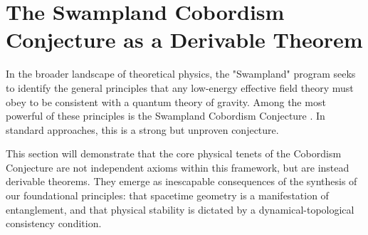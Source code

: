 \documentclass[11pt, letterpaper]{report}
\theoremstyle{plain} %
\theoremstyle{definition} %
\theoremstyle{remark} %
\begin{document}
\section{The Swampland Cobordism Conjecture as a Derivable Theorem}
\label{sec:scc_derivation}

In the broader landscape of theoretical physics, the "Swampland" program seeks to identify the general principles that any low-energy effective field theory must obey to be consistent with a quantum theory of gravity. Among the most powerful of these principles is the Swampland Cobordism Conjecture \cite{McNamara2019Cobordism}. In standard approaches, this is a strong but unproven conjecture.

This section will demonstrate that the core physical tenets of the Cobordism Conjecture are not independent axioms within this framework, but are instead derivable theorems. They emerge as inescapable consequences of the synthesis of our foundational principles: that spacetime geometry is a manifestation of entanglement, and that physical stability is dictated by a dynamical-topological consistency condition.
\end{document}
